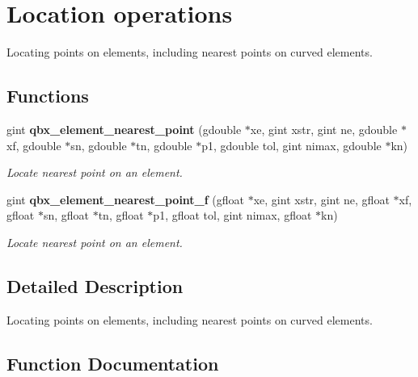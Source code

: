 \section{Location operations}
\label{group__location}


Locating points on elements, including nearest points on curved elements.  


\subsection*{Functions}
\begin{DoxyCompactItemize}
\item 
gint {\bf qbx\+\_\+element\+\_\+nearest\+\_\+point} (gdouble $\ast$xe, gint xstr, gint ne, gdouble $\ast$xf, gdouble $\ast$sn, gdouble $\ast$tn, gdouble $\ast$p1, gdouble tol, gint nimax, gdouble $\ast$kn)
\begin{DoxyCompactList}\small\item\em Locate nearest point on an element. \end{DoxyCompactList}\item 
gint {\bf qbx\+\_\+element\+\_\+nearest\+\_\+point\+\_\+f} (gfloat $\ast$xe, gint xstr, gint ne, gfloat $\ast$xf, gfloat $\ast$sn, gfloat $\ast$tn, gfloat $\ast$p1, gfloat tol, gint nimax, gfloat $\ast$kn)
\begin{DoxyCompactList}\small\item\em Locate nearest point on an element. \end{DoxyCompactList}\end{DoxyCompactItemize}


\subsection{Detailed Description}
Locating points on elements, including nearest points on curved elements. 



\subsection{Function Documentation}
